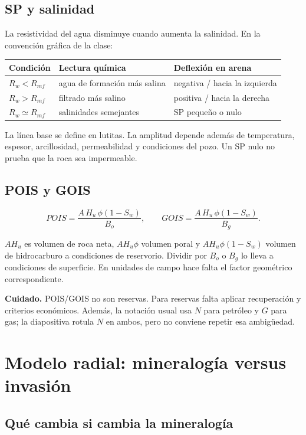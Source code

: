 \documentclass[10.5pt,a4paper]{article}
\newcommand{\cuidado}[1]{\par\textcolor{rojo}{\textbf{Cuidado.} #1}\par}
\begin{document}
\subsection{SP y salinidad}

La resistividad del agua disminuye cuando aumenta la salinidad. En la convenci\'on gr\'afica de la clase:

\begin{center}
\begin{tabular}{lll}
\toprule
Condici\'on & Lectura qu\'imica & Deflexi\'on en arena \\
\midrule
$R_w<R_{mf}$ & agua de formaci\'on m\'as salina & negativa / hacia la izquierda \\
$R_w>R_{mf}$ & filtrado m\'as salino & positiva / hacia la derecha \\
$R_w\simeq R_{mf}$ & salinidades semejantes & SP peque\~no o nulo \\
\bottomrule
\end{tabular}
\end{center}

La l\'inea base se define en lutitas. La amplitud depende adem\'as de temperatura, espesor, arcillosidad, permeabilidad y condiciones del pozo. Un SP nulo no prueba que la roca sea impermeable.

\subsection{POIS y GOIS}

\[
\boxed{POIS=\frac{A\,H_u\,\phi(1-S_w)}{B_o}},
\qquad
\boxed{GOIS=\frac{A\,H_u\,\phi(1-S_w)}{B_g}}.
\]

$AH_u$ es volumen de roca neta, $AH_u\phi$ volumen poral y $AH_u\phi(1-S_w)$ volumen de hidrocarburo a condiciones de reservorio. Dividir por $B_o$ o $B_g$ lo lleva a condiciones de superficie. En unidades de campo hace falta el factor geom\'etrico correspondiente.

\cuidado{POIS/GOIS no son reservas. Para reservas falta aplicar recuperaci\'on y criterios econ\'omicos. Adem\'as, la notaci\'on usual usa $N$ para petr\'oleo y $G$ para gas; la diapositiva rotula $N$ en ambos, pero no conviene repetir esa ambig\"uedad.}

\section{Modelo radial: mineralog\'ia versus invasi\'on}

\subsection{Qu\'e cambia si cambia la mineralog\'ia}
\end{document}
